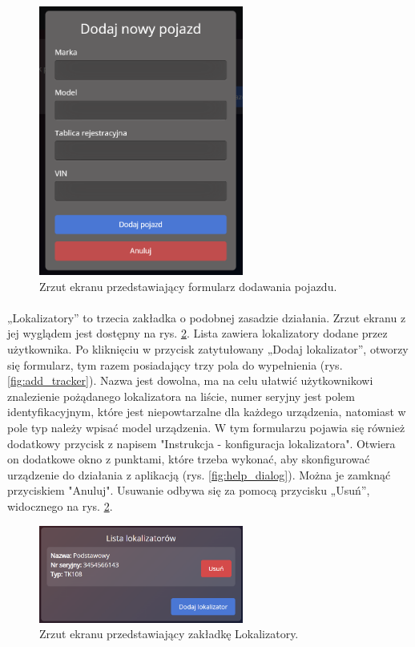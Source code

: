 \begin{figure}
	\centering
	\includegraphics[width=0.6\textwidth]{./graf/add_vehicle.png}
	\caption{Zrzut ekranu przedstawiający formularz dodawania pojazdu.}
	\label{fig:add_vehicle}
\end{figure}

\paragraph{}
„Lokalizatory” to trzecia zakładka o podobnej zasadzie działania. Zrzut ekranu z jej wyglądem jest dostępny na rys. \ref{fig:tracker_tab}. Lista zawiera lokalizatory dodane przez użytkownika. Po kliknięciu w przycisk zatytułowany „Dodaj lokalizator”, otworzy się formularz, tym razem posiadający trzy pola do wypełnienia (rys.\ref{fig:add_tracker}). Nazwa jest dowolna, ma na celu ułatwić użytkownikowi znalezienie pożądanego lokalizatora na liście, numer seryjny jest polem identyfikacyjnym, które jest niepowtarzalne dla każdego urządzenia, natomiast w pole typ należy wpisać model urządzenia. W tym formularzu pojawia się również dodatkowy przycisk z napisem "Instrukcja - konfiguracja lokalizatora". Otwiera on dodatkowe okno z punktami, które trzeba wykonać, aby skonfigurować urządzenie do działania z aplikacją (rys. \ref{fig:help_dialog}). Można je zamknąć przyciskiem "Anuluj". Usuwanie odbywa się za pomocą przycisku „Usuń”, widocznego na rys. \ref{fig:tracker_tab}.

\begin{figure}
	\centering
	\includegraphics[width=0.6\textwidth]{./graf/tracker_tab.png}
	\caption{Zrzut ekranu przedstawiający zakładkę Lokalizatory.}
	\label{fig:tracker_tab}
\end{figure}

